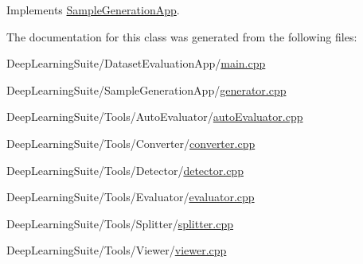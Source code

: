 Implements \hyperlink{class_sample_generation_app_a351fe6cfe624aeeee9ba4fb04d80ca0f}{Sample\+Generation\+App}.



The documentation for this class was generated from the following files\+:\begin{DoxyCompactItemize}
\item 
Deep\+Learning\+Suite/\+Dataset\+Evaluation\+App/\hyperlink{main_8cpp}{main.\+cpp}\item 
Deep\+Learning\+Suite/\+Sample\+Generation\+App/\hyperlink{generator_8cpp}{generator.\+cpp}\item 
Deep\+Learning\+Suite/\+Tools/\+Auto\+Evaluator/\hyperlink{auto_evaluator_8cpp}{auto\+Evaluator.\+cpp}\item 
Deep\+Learning\+Suite/\+Tools/\+Converter/\hyperlink{_tools_2_converter_2_converter_8cpp}{converter.\+cpp}\item 
Deep\+Learning\+Suite/\+Tools/\+Detector/\hyperlink{_tools_2_detector_2_detector_8cpp}{detector.\+cpp}\item 
Deep\+Learning\+Suite/\+Tools/\+Evaluator/\hyperlink{_tools_2_evaluator_2_evaluator_8cpp}{evaluator.\+cpp}\item 
Deep\+Learning\+Suite/\+Tools/\+Splitter/\hyperlink{splitter_8cpp}{splitter.\+cpp}\item 
Deep\+Learning\+Suite/\+Tools/\+Viewer/\hyperlink{_tools_2_viewer_2_viewer_8cpp}{viewer.\+cpp}\end{DoxyCompactItemize}

